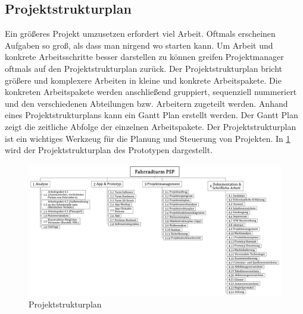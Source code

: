\subsection{Projektstrukturplan}

Ein größeres Projekt umzusetzen erfordert viel Arbeit. Oftmals erscheinen Aufgaben so groß, als dass man nirgend wo starten kann. Um Arbeit und konkrete Arbeitsschritte besser darstellen zu können greifen Projektmanager oftmals auf den Projektstrukturplan zurück. Der Projektstrukturplan bricht größere und komplexere Arbeiten in kleine und konkrete Arbeitspakete. Die konkreten Arbeitspakete werden anschließend gruppiert, sequenziell nummeriert und den verschiedenen Abteilungen bzw. Arbeitern zugeteilt werden. Anhand eines Projektstrukturplans kann ein Gantt Plan erstellt werden. Der Gantt Plan zeigt die zeitliche Abfolge der einzelnen Arbeitspakete. Der Projektstrukturplan ist ein wichtiges Werkzeug für die Planung und Steuerung von Projekten. In \ref{fig:projektstrukturplan} wird der Projektstrukturplan des Prototypen dargestellt.

\begin{figure}[ht]
  \centering
  \includegraphics[width=1\textwidth]{images/projektstrukturplan}
  \caption{Projektstrukturplan}
  \label{fig:projektstrukturplan}
\end{figure}
